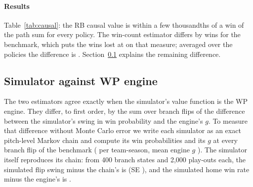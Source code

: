 \documentclass[aoas]{imsart}
\theoremstyle{plain}
\theoremstyle{definition}
\begin{document}
\begin{table}[!htbp]
\caption{Path-sum and causal values, wins per team-season, with 95\% intervals for the differences from
\CausalBootN{} game resamples of the per-game outputs at fixed fitted parameters.}\label{tab:causal}
\centering\scriptsize
\resizebox{\textwidth}{!}{}
\end{table}

\paragraph{Results} Table~\ref{tab:causal}: the RB causal value is within a few thousandths of a win of the path sum
for every policy. The win-count estimator differs by \BinaryMinusRB{} \BinaryMinusRBCI{} wins for the benchmark, which
puts the wins lost at \BinaryLost{} \BinaryLostCI{} on that measure; averaged over the \SGapNPolicies{} policies the
difference is \SGapAvgNew. Section~\ref{sec:causalgap} explains the remaining difference.

\subsection{Simulator against WP engine}\label{sec:causalgap}
The two estimators agree exactly when the simulator's value function is the WP engine. They differ, to first order,
by the sum over branch flips of the difference between the simulator's swing in win probability and the engine's $g$.
To measure that difference without Monte Carlo error we write each simulator as an exact pitch-level Markov chain and
compute its win probabilities and its $g$ at every branch flip of the benchmark (\SGapBranches{} per team-season, mean
engine $g$ \SGapMeanG). The simulator itself reproduces its chain: from 400 branch states and 2,000 play-outs each,
the simulated flip swing minus the chain's is \SGapMCNew{} (SE \SGapMCNewSE), and the simulated home win rate minus
the engine's is \SGapLevelNew.
\end{document}
